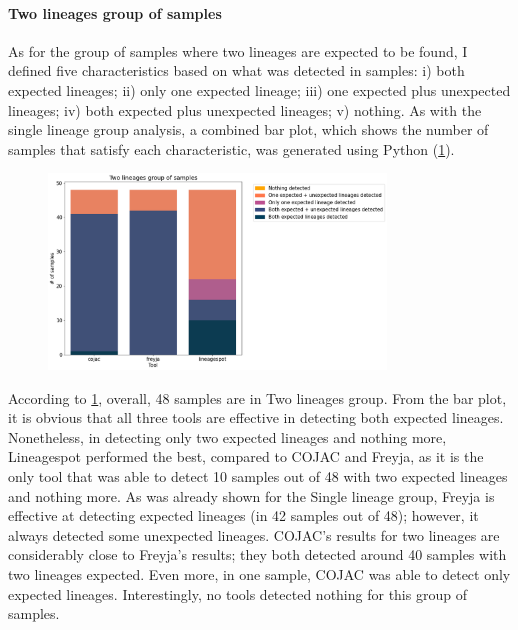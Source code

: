                 
            \paragraph{Two lineages group of samples}
            As for the group of samples where two lineages are expected to be found, I defined five characteristics based on what was detected in samples: i) both expected lineages; ii) only one expected lineage; iii) one expected plus unexpected lineages; iv) both expected plus unexpected lineages; v) nothing. As with the single lineage group analysis, a combined bar plot, which shows the number of samples that satisfy each characteristic, was generated using Python (\cref{fig:results:mock:bar-twolin}). 
            \begin{figure}[ht!]
                \centering
                \includegraphics[width=0.8\textwidth]{figures/results/mock/twolin-num-bars.png}
                \label{fig:results:mock:bar-twolin}
            \end{figure}
            
                According to \cref{fig:results:mock:bar-twolin}, overall, 48 samples are in Two lineages group. From the bar plot, it is obvious that all three tools are effective in detecting both expected lineages. Nonetheless, in detecting only two expected lineages and nothing more, Lineagespot performed the best, compared to COJAC and Freyja, as it is the only tool that was able to detect 10 samples out of 48 with two expected lineages and nothing more. As was already shown for the Single lineage group, Freyja is effective at detecting expected lineages (in 42 samples out of 48); however, it always detected some unexpected lineages. COJAC's results for two lineages are considerably close to Freyja's results; they both detected around 40 samples with two lineages expected. Even more, in one sample, COJAC was able to detect only expected lineages. Interestingly, no tools detected nothing for this group of samples.

